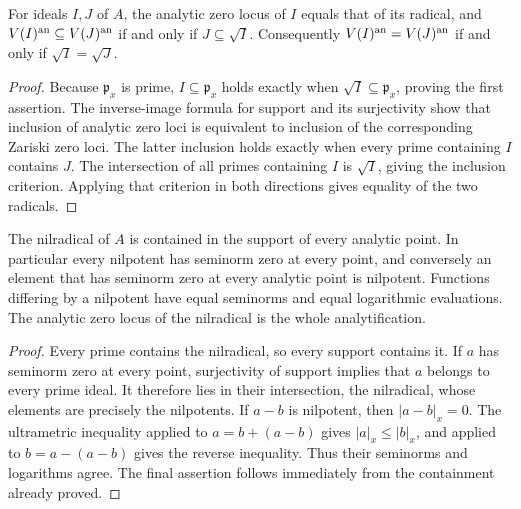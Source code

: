 \begin{lemma}\label{berk:zero-locus-radical}
\leanok
{}
For ideals $I,J$ of $A$, the analytic zero locus of $I$ equals that of its radical,
and $V(I)^{\mathrm{an}}\subseteq V(J)^{\mathrm{an}}$ if and only if $J\subseteq\sqrt I$.
Consequently $V(I)^{\mathrm{an}}=V(J)^{\mathrm{an}}$ if and only if $\sqrt I=\sqrt J$.
\end{lemma}
\begin{proof}
Because $\mathfrak p_x$ is prime, $I\subseteq\mathfrak p_x$ holds exactly when
$\sqrt I\subseteq\mathfrak p_x$, proving the first assertion.
The inverse-image formula for support and its surjectivity show that inclusion
of analytic zero loci is equivalent to inclusion of the corresponding Zariski zero loci.
The latter inclusion holds exactly when every prime containing $I$ contains $J$.
The intersection of all primes containing $I$ is $\sqrt I$, giving the inclusion criterion.
Applying that criterion in both directions gives equality of the two radicals.
\end{proof}

\begin{lemma}\label{berk:nilpotents}
\leanok
{}
The nilradical of $A$ is contained in the support of every analytic point.
In particular every nilpotent has seminorm zero at every point, and conversely
an element that has seminorm zero at every analytic point is nilpotent.
Functions differing by a nilpotent have equal seminorms and equal logarithmic evaluations.
The analytic zero locus of the nilradical is the whole analytification.
\end{lemma}
\begin{proof}
Every prime contains the nilradical, so every support contains it.
If $a$ has seminorm zero at every point, surjectivity of support implies that
$a$ belongs to every prime ideal. It therefore lies in their intersection,
the nilradical, whose elements are precisely the nilpotents.
If $a-b$ is nilpotent, then $|a-b|_x=0$. The ultrametric inequality applied to
$a=b+(a-b)$ gives $|a|_x\le|b|_x$, and applied to $b=a-(a-b)$ gives the reverse
inequality. Thus their seminorms and logarithms agree.
The final assertion follows immediately from the containment already proved.
\end{proof}

